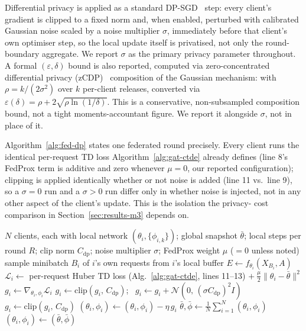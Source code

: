 \documentclass[journal]{IEEEtran}
\begin{document}
Differential privacy is applied as a standard DP-SGD~\cite{dpsgd} step:
every client's gradient is clipped to a fixed norm and, when enabled,
perturbed with calibrated Gaussian noise scaled by a noise multiplier
$\sigma$, immediately before that client's own optimiser step, so
the local update itself is privatised, not only the round-boundary
aggregate. We report $\sigma$ as the primary privacy parameter
throughout. A formal $(\varepsilon,\delta)$ bound is also reported,
computed via zero-concentrated differential privacy
(zCDP)~\cite{zcdp} composition
of the Gaussian mechanism: with $\rho = k/(2\sigma^2)$ over $k$
per-client releases, converted via
$\varepsilon(\delta)=\rho+2\sqrt{\rho\ln(1/\delta)}$. This is a
conservative, non-subsampled composition bound, not a tight
moments-accountant figure. We report it alongside $\sigma$, not in
place of it.

Algorithm~\ref{alg:fed-dp} states one federated round precisely. Every
client runs the identical per-request TD loss Algorithm~\ref{alg:gat-ctde}
already defines (line 8's FedProx term is additive and zero whenever
$\mu{=}0$, our reported configuration); clipping is applied identically
whether or not noise is added (line 11 vs.\ line 9), so a $\sigma{=}0$
run and a $\sigma{>}0$ run differ only in whether noise is injected, not
in any other aspect of the client's update. This is the isolation the privacy-
cost comparison in Section~\ref{sec:results-m3} depends on.

\begin{algorithm}[t]
\caption{Federated GAT-CTDE round with DP-SGD}
\label{alg:fed-dp}
\begin{algorithmic}[1]
\REQUIRE $N$ clients, each with local network $(\theta_i, \{\phi_{i,k}\})$; global snapshot $\bar\theta$; local steps per round $R$; clip norm $C_{\text{dp}}$; noise multiplier $\sigma$; FedProx weight $\mu$ ($=0$ unless noted)
    \STATE sample minibatch $B_i$ of $i$'s own requests from $i$'s local buffer
    \STATE $E \gets f_{\theta_i}(X_{B_i}, A)$ 
    \STATE $\mathcal{L}_i \gets$ per-request Huber TD loss (Alg.~\ref{alg:gat-ctde}, lines 11--13) $+\ \frac{\mu}{2}\lVert \theta_i - \bar\theta \rVert^2$ 
    \STATE $g_i \gets \nabla_{\theta_i,\phi_i} \mathcal{L}_i$
      \STATE $g_i \gets \text{clip}(g_i,\, C_{\text{dp}})$; \ $g_i \gets g_i + \mathcal{N}(0,\, (\sigma C_{\text{dp}})^2 I)$ 
    \ELSE
      \STATE $g_i \gets \text{clip}(g_i,\, C_{\text{dp}})$ 
    \ENDIF
    \STATE $(\theta_i, \phi_i) \gets (\theta_i, \phi_i) - \eta\, g_i$
  \ENDFOR
  \STATE $\bar\theta, \bar\phi \gets \frac{1}{N}\sum_{i=1}^N (\theta_i, \phi_i)$ 
    \STATE $(\theta_i, \phi_i) \gets (\bar\theta, \bar\phi)$ 
  \ENDFOR
\ENDFOR
\end{algorithmic}
\end{algorithm}
\end{document}
